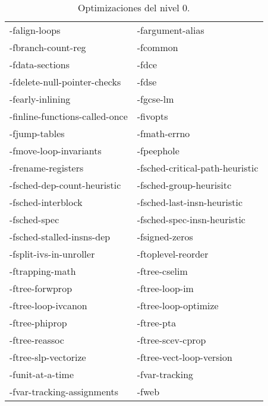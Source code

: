 \begin{table}[htb]
\begin{center}
	\begin{tabular}{ll}
		-falign-loops & -fargument-alias\\
		-fbranch-count-reg & -fcommon\\
		-fdata-sections & -fdce\\
		-fdelete-null-pointer-checks & -fdse\\
		-fearly-inlining & -fgcse-lm\\
		-finline-functions-called-once & -fivopts\\
		-fjump-tables & -fmath-errno\\
		-fmove-loop-invariants & -fpeephole\\
		-frename-registers & -fsched-critical-path-heuristic\\
		-fsched-dep-count-heuristic & -fsched-group-heurisitc\\
		-fsched-interblock & -fsched-last-insn-heuristic\\
		-fsched-spec & -fsched-spec-insn-heuristic\\
		-fsched-stalled-insns-dep & -fsigned-zeros\\
		-fsplit-ivs-in-unroller & -ftoplevel-reorder\\
		-ftrapping-math & -ftree-cselim\\
		-ftree-forwprop & -ftree-loop-im\\
		-ftree-loop-ivcanon & -ftree-loop-optimize\\
		-ftree-phiprop & -ftree-pta\\
		-ftree-reassoc & -ftree-scev-cprop\\
		-ftree-slp-vectorize & -ftree-vect-loop-version\\
		-funit-at-a-time & -fvar-tracking\\
		-fvar-tracking-assignments & -fweb\\
	\end{tabular}
\end{center}
\caption{Optimizaciones del nivel 0.}
\label{opt0}
\end{table}

